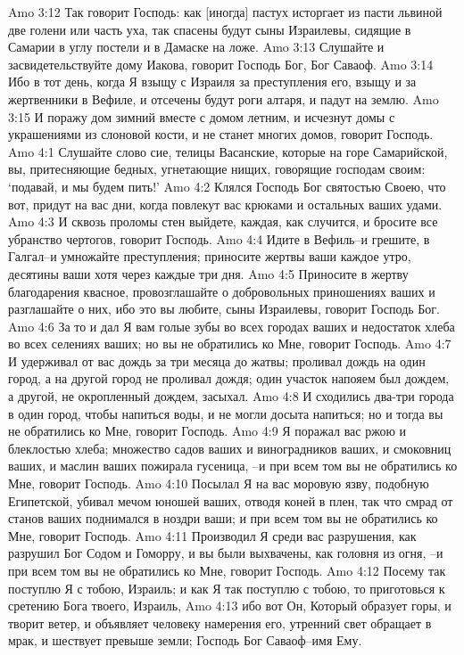 Amo 3:12  Так говорит Господь: как [иногда] пастух исторгает из пасти львиной две голени или часть уха, так спасены будут сыны Израилевы, сидящие в Самарии в углу постели и в Дамаске на ложе.
Amo 3:13  Слушайте и засвидетельствуйте дому Иакова, говорит Господь Бог, Бог Саваоф.
Amo 3:14  Ибо в тот день, когда Я взыщу с Израиля за преступления его, взыщу и за жертвенники в Вефиле, и отсечены будут роги алтаря, и падут на землю.
Amo 3:15  И поражу дом зимний вместе с домом летним, и исчезнут домы с украшениями из слоновой кости, и не станет многих домов, говорит Господь.
Amo 4:1  Слушайте слово сие, телицы Васанские, которые на горе Самарийской, вы, притесняющие бедных, угнетающие нищих, говорящие господам своим: `подавай, и мы будем пить!'
Amo 4:2  Клялся Господь Бог святостью Своею, что вот, придут на вас дни, когда повлекут вас крюками и остальных ваших удами.
Amo 4:3  И сквозь проломы стен выйдете, каждая, как случится, и бросите все убранство чертогов, говорит Господь.
Amo 4:4  Идите в Вефиль--и грешите, в Галгал--и умножайте преступления; приносите жертвы ваши каждое утро, десятины ваши хотя через каждые три дня.
Amo 4:5  Приносите в жертву благодарения квасное, провозглашайте о добровольных приношениях ваших и разглашайте о них, ибо это вы любите, сыны Израилевы, говорит Господь Бог.
Amo 4:6  За то и дал Я вам голые зубы во всех городах ваших и недостаток хлеба во всех селениях ваших; но вы не обратились ко Мне, говорит Господь.
Amo 4:7  И удерживал от вас дождь за три месяца до жатвы; проливал дождь на один город, а на другой город не проливал дождя; один участок напояем был дождем, а другой, не окропленный дождем, засыхал.
Amo 4:8  И сходились два-три города в один город, чтобы напиться воды, и не могли досыта напиться; но и тогда вы не обратились ко Мне, говорит Господь.
Amo 4:9  Я поражал вас ржою и блеклостью хлеба; множество садов ваших и виноградников ваших, и смоковниц ваших, и маслин ваших пожирала гусеница, --и при всем том вы не обратились ко Мне, говорит Господь.
Amo 4:10  Посылал Я на вас моровую язву, подобную Египетской, убивал мечом юношей ваших, отводя коней в плен, так что смрад от станов ваших поднимался в ноздри ваши; и при всем том вы не обратились ко Мне, говорит Господь.
Amo 4:11  Производил Я среди вас разрушения, как разрушил Бог Содом и Гоморру, и вы были выхвачены, как головня из огня, --и при всем том вы не обратились ко Мне, говорит Господь.
Amo 4:12  Посему так поступлю Я с тобою, Израиль; и как Я так поступлю с тобою, то приготовься к сретению Бога твоего, Израиль,
Amo 4:13  ибо вот Он, Который образует горы, и творит ветер, и объявляет человеку намерения его, утренний свет обращает в мрак, и шествует превыше земли; Господь Бог Саваоф--имя Ему.
